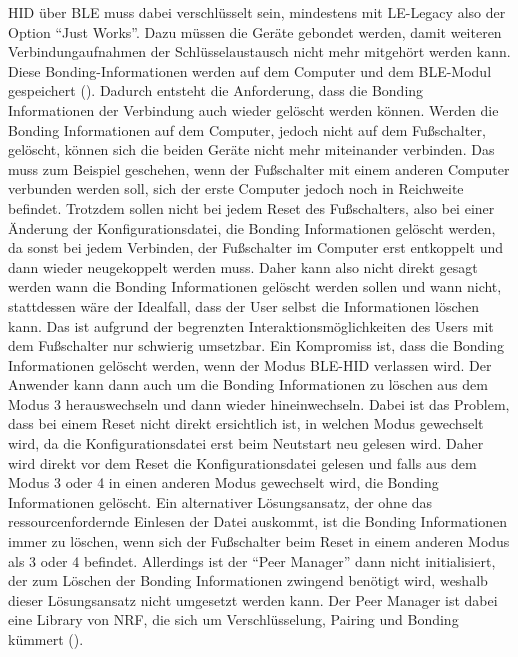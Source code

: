\ac{HID} über \ac{BLE} muss dabei verschlüsselt sein, mindestens mit LE-Legacy also der Option ``Just Works''. Dazu müssen die Geräte gebondet werden, damit weiteren Verbindungaufnahmen der Schlüsselaustausch nicht mehr mitgehört werden kann. Diese Bonding-Informationen werden auf dem Computer und dem \ac{BLE}-Modul gespeichert (\cite[78]{HID_BLE_Specification}). Dadurch entsteht die Anforderung, dass die Bonding Informationen der Verbindung auch wieder gelöscht werden können. Werden die Bonding Informationen auf dem Computer, jedoch nicht auf dem Fußschalter, gelöscht, können sich die beiden Geräte nicht mehr miteinander verbinden. Das muss zum Beispiel geschehen, wenn der Fußschalter mit einem anderen Computer verbunden werden soll, sich der erste Computer jedoch noch in Reichweite befindet. Trotzdem sollen nicht bei jedem Reset des Fußschalters, also bei einer Änderung der Konfigurationsdatei, die Bonding Informationen gelöscht werden, da sonst bei jedem Verbinden, der Fußschalter im Computer erst entkoppelt und dann wieder neugekoppelt werden muss. Daher kann also nicht direkt gesagt werden wann die Bonding Informationen gelöscht werden sollen und wann nicht, stattdessen wäre der Idealfall, dass der User selbst die Informationen löschen kann. Das ist aufgrund der begrenzten Interaktionsmöglichkeiten des Users mit dem Fußschalter nur schwierig umsetzbar. Ein Kompromiss ist, dass die Bonding Informationen gelöscht werden, wenn der Modus \ac{BLE}-\ac{HID} verlassen wird. Der Anwender kann dann auch um die Bonding Informationen zu löschen aus dem Modus 3 herauswechseln und dann wieder hineinwechseln. Dabei ist das Problem, dass bei einem Reset nicht direkt ersichtlich ist, in welchen Modus gewechselt wird, da die Konfigurationsdatei erst beim Neutstart neu gelesen wird. Daher wird direkt vor dem Reset die Konfigurationsdatei gelesen und falls aus dem Modus 3 oder 4 in einen anderen Modus gewechselt wird, die Bonding Informationen gelöscht. Ein alternativer Lösungsansatz, der ohne das ressourcenfordernde Einlesen der Datei auskommt, ist die Bonding Informationen immer zu löschen, wenn sich der Fußschalter beim Reset in einem anderen Modus als 3 oder 4 befindet. Allerdings ist der ``Peer Manager'' dann nicht initialisiert, der zum Löschen der Bonding Informationen zwingend benötigt wird, weshalb dieser Lösungsansatz nicht umgesetzt werden kann. Der Peer Manager ist dabei eine Library von NRF, die sich um Verschlüsselung, Pairing und Bonding kümmert (\cite[]{NRF_PeerManager}).\\
